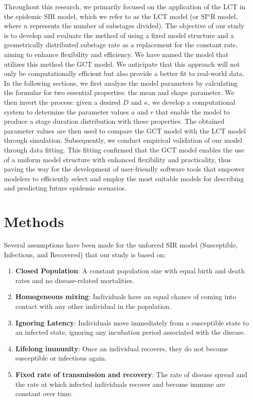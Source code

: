 \documentclass[12pt]{article}
\begin{document}
Throughout this research, we primarily focused on the application of the LCT in the epidemic SIR model, which we refer to as the LCT model (or SI$^n$R model, where $n$ represents the number of substages divided). The objective of our study is to develop and evaluate the method of using a fixed model structure and a geometrically distributed substage rate as a replacement for the constant rate, aiming to enhance flexibility and efficiency. We have named the model that utilizes this method the GCT model. We anticipate that this approach will not only be computationally efficient but also provide a better fit to real-world data. In the following sections, we first analyze the model parameters by calculating the formulae for two essential properties: the mean and shape parameter. We then invert the process: given a desired $D$ and $\kappa$, we develop a computational system to determine the parameter values $a$ and $r$ that enable the model to produce a stage duration distribution with these properties. The obtained parameter values are then used to compare the GCT model with the LCT model through simulation. Subsequently, we conduct empirical validation of our model through data fitting. This fitting confirmed that the GCT model enables the use of a uniform model structure with enhanced flexibility and practicality, thus paving the way for the development of user-friendly software tools that empower modelers to efficiently select and employ the most suitable models for describing and predicting future epidemic scenarios.


\section{Methods}
\label{Methods}
Several assumptions have been made for the unforced SIR model (Susceptible, Infectious, and Recovered) that our study is based on: 
\begin{enumerate}
    \item \textbf{Closed Population}: A constant population size with equal birth and death rates and no disease-related mortalities.
    \item \textbf{Homogeneous mixing}: Individuals have an equal chance of coming into contact with any other individual in the population. 
    \item \textbf{Ignoring Latency}: Individuals move immediately from a susceptible state to an infected state, ignoring any incubation period associated with the disease.
    \item \textbf{Lifelong immunity}: Once an individual recovers, they do not become susceptible or infectious again.
    \item \textbf{Fixed rate of transmission and recovery}: The rate of disease spread and the rate at which infected individuals recover and become immune are constant over time.
\end{enumerate}
\end{document}
